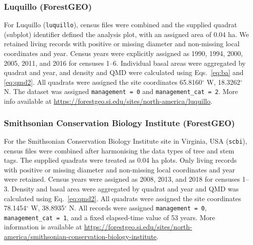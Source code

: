 \documentclass{myreport}
\begin{document}

% 

\subsubsection{Luquillo (ForestGEO)}
For Luquillo (\texttt{luquillo}), census files were combined and the supplied quadrat (subplot) identifier defined the analysis plot, with an assigned area of 0.04 ha. We retained living records with positive or missing diameter and non-missing local coordinates and year. Census years were explicitly assigned as 1990, 1994, 2000, 2005, 2011, and 2016 for censuses 1--6. Individual basal areas were aggregated by quadrat and year, and density and QMD were calculated using Eqs.~\ref{eq:ba} and \ref{eq:qmd2}. All quadrats were assigned the site coordinates 65.8160$^\circ$ W, 18.3262$^\circ$ N. The dataset was assigned \texttt{management = 0} and \texttt{management\_cat = 2}. More info available at \url{https://forestgeo.si.edu/sites/north-america/luquillo}.



% 

\subsubsection{Smithsonian Conservation Biology Institute (ForestGEO)}
For the Smithsonian Conservation Biology Institute site in Virginia, USA (\texttt{scbi}), census files were combined after harmonising the data types of tree and stem tags. The supplied quadrats were treated as 0.04 ha plots. Only living records with positive or missing diameter and non-missing local coordinates and year were retained. Census years were assigned as 2008, 2013, and 2018 for censuses 1--3. Density and basal area were aggregated by quadrat and year and QMD was calculated using Eq.~\ref{eq:qmd2}. All quadrats were assigned the site coordinates 78.1454$^\circ$ W, 38.8935$^\circ$ N. All records were assigned \texttt{management = 0}, \texttt{management\_cat = 1}, and a fixed elapsed-time value of 53 years. More information is available at \url{https://forestgeo.si.edu/sites/north-america/smithsonian-conservation-biology-institute}.
\end{document}
